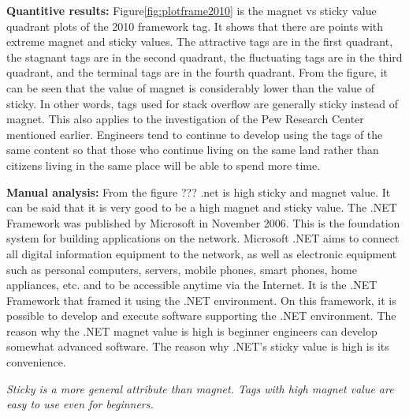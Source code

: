 \documentclass[conference]{IEEEtran}
\begin{document}
\textbf{Quantitive results:}
Figure\ref{fig:plotframe2010} is the magnet vs sticky value quadrant plots of the 2010 framework tag. It shows that there are points with extreme magnet and sticky values. The attractive tags are in the first quadrant, the stagnant tags are in the second quadrant, the fluctuating tags are in the third quadrant, and the terminal tags are in the fourth quadrant. From the figure, it can be seen that the value of magnet is considerably lower than the value of sticky. In other words, tags used for stack overflow are generally sticky instead of magnet. This also applies to the investigation of the Pew Research Center mentioned earlier. Engineers tend to continue to develop using the tags of the same content so that those who continue living on the same land rather than citizens living in the same place will be able to spend more time. 

\textbf{Manual analysis:}
From the figure ??? .net is high sticky and magnet value. It can be said that it is very good to be a high magnet and sticky value. The .NET Framework was published by Microsoft in November 2006. This is the foundation system for building applications on the network.  Microsoft .NET aims to connect all digital information equipment to the network, as well as electronic equipment such as personal computers, servers, mobile phones, smart phones, home appliances, etc. and to be accessible anytime via the Internet. It is the .NET Framework that framed it using the .NET environment. On this framework, it is possible to develop and execute software supporting the .NET environment. The reason why the .NET magnet value is high is beginner engineers can develop somewhat advanced software. The reason why .NET's sticky value is high is its convenience.
 

 \emph{Sticky is a more general attribute than magnet. Tags with high magnet value are easy to use even for beginners.}
\end{document}
